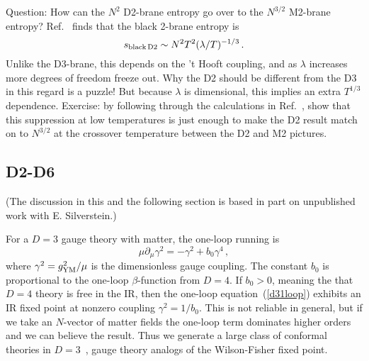\documentclass[12pt]{article}
\begin{document}
{Question: How can the $N^2$ D2-brane entropy go over to the $N^{3/2}$ M2-brane entropy?  Ref.~\cite{Itzhaki:1998dd} finds that the black 2-brane entropy is
\begin{equation}
s_{\rm black\,D2} \sim  N^2 T^2 (\lambda/T)^{-1/3} \,.
\end{equation}
Unlike the D3-brane, this depends on the 't Hooft coupling, and as $\lambda$ increases more degrees of freedom freeze out.  Why the D2 should be different from the D3 in this regard is a puzzle!   But because $\lambda$ is dimensional, this implies an extra $T^{1/3}$ dependence.  Exercise: by following through the calculations in Ref.~\cite{Itzhaki:1998dd}, show that this  suppression at low temperatures is just enough to make the D2 result match on to $N^{3/2}$ at the crossover temperature between the D2 and M2 pictures.

\subsection{D2-D6}

(The discussion in this and the following section is based in part on unpublished work with E. Silverstein.)  

For a $D=3$ gauge theory with matter, the one-loop running is
\begin{equation}
\mu\partial_\mu \gamma^2 = -\gamma^2 + b_0 \gamma^4 \,, \label{d31loop}
\end{equation}
where $\gamma^2 = g_{\rm YM}^2 / \mu$ is the dimensionless gauge coupling.  The constant $b_0$ is proportional to the one-loop $\beta$-function from $D=4$.  If $b_0 > 0$, meaning the that $D=4$ theory is free in the IR, then the one-loop equation~(\ref{d31loop}) exhibits an IR fixed point at nonzero coupling $\gamma^2 = 1/b_0$.  This is not reliable in general, but if we take an $N$-vector of matter fields the one-loop term dominates higher orders and we can believe the result.  Thus we generate a large class of conformal theories in $D=3$~\cite{Appelquist:1989tc}, gauge theory analogs of the Wilson-Fisher fixed point.

}
\end{document}
